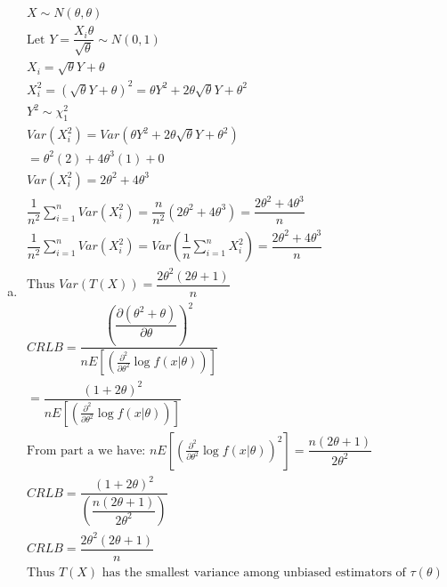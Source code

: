 \documentclass{article}
\newcommand{\pderiv}[2]{\frac{\partial #1}{\partial #2} }
\newcommand{\sumn}{\sum_{i=1}^{n}}
\begin{document}
\begin{flushleft}
\begin{enumerate}[(a)]
	\item 
\begin{multline*}\\
X\sim N(\theta,\theta)\\
\text{Let } Y=\dfrac{X_i \theta}{\sqrt{\theta}}\sim N(0,1)\\
X_i=\sqrt{\theta}Y+\theta\\
X_i^2=(\sqrt{\theta}Y+\theta)^2=\theta Y^2+2\theta\sqrt{\theta}Y+\theta^2\\
Y^2\sim \chi^2_{1}\\
Var(X_i^2)=Var(\theta Y^2+2\theta\sqrt{\theta}Y+\theta^2)\\
=\theta^2(2)+4\theta^3(1)+0\\
Var(X_i^2)=2\theta^2+4\theta^3\\
\dfrac{1}{n^2}\sumn Var(X_i^2)=\dfrac{n}{n^2}(2\theta^2+4\theta^3)=\dfrac{2\theta^2+4\theta^3}{n}\\
\dfrac{1}{n^2}\sumn Var(X_i^2)=Var\left(\dfrac{1}{n}\sumn X_i^2\right)=\dfrac{2\theta^2+4\theta^3}{n}\\ 
\text{Thus } Var(T(X))=\dfrac{2\theta^2(2\theta+1)}{n}\\
CRLB=\dfrac{\left(\dfrac{\partial(\theta^2+\theta)}{\partial \theta} \right)^2}{nE[(\pderiv{^2}{\theta^2}\log f(x|\theta))]}\\
=\dfrac{(1+2\theta)^2}{nE[(\pderiv{^2}{\theta^2}\log f(x|\theta))]}\\
\text{From part a we have: } nE[(\pderiv{^2}{\theta^2}\log f(x|\theta))^2]= \dfrac{n(2\theta+1)}{2\theta^2}\\
CRLB=\dfrac{(1+2\theta)^2}{\left(\dfrac{n(2\theta+1)}{2\theta^2}\right)}\\
CRLB=\dfrac{2\theta^2(2\theta+1)}{n}\\
\text{Thus } T(X) \text{ has the smallest variance among unbiased estimators of } \tau(\theta)\\
\end{multline*}
	
\end{enumerate}

\end{flushleft}
\end{document}
